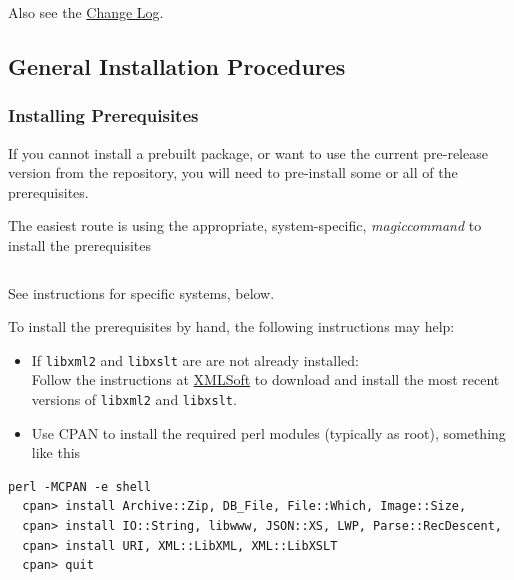 \documentclass{article}
\begin{document}
Also see the \href{Changes}{Change Log}.

\subsection{General Installation Procedures}\label{install.general}
\subsubsection{Installing Prerequisites}\label{install.prerequisites}
If you cannot install a prebuilt package, or want to use the current
pre-release version from the repository, you will need to pre-install some or
all of the prerequisites.

The easiest route is using the appropriate, system-specific,
\textit{magiccommand} to install the prerequisites
\begin{lstlisting}[style=shell]
%magiccommand% %prerequisite% ...
\end{lstlisting}
See instructions for specific systems, below.

To install the prerequisites by hand, the following instructions may help:
\begin{itemize}
\item If \texttt{libxml2} and \texttt{libxslt} are are not already installed:\\
  Follow the instructions at \href{http://www.xmlsoft.org}{XMLSoft} to
  download and install the most recent versions of \texttt{libxml2} and \texttt{libxslt}.
\item Use CPAN to install the required perl modules (typically as root), something like this
\end{itemize}
\begin{lstlisting}[style=shell]
perl -MCPAN -e shell
  cpan> install Archive::Zip, DB_File, File::Which, Image::Size,
  cpan> install IO::String, libwww, JSON::XS, LWP, Parse::RecDescent,
  cpan> install URI, XML::LibXML, XML::LibXSLT
  cpan> quit
\end{lstlisting}
\end{document}
